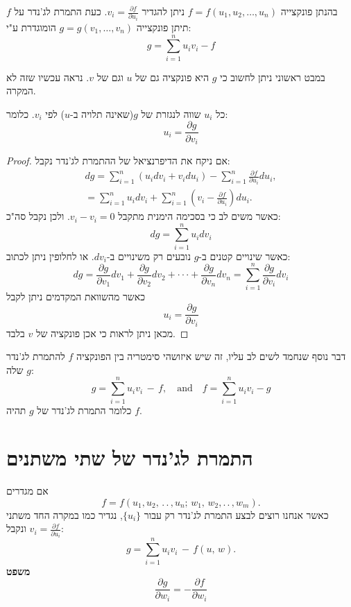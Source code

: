 \documentclass{tstextbook}
\begin{document}
\begin{definition}
בהנתן פונקצייה \(f=f\left( u_{1},u_{2},\dots,u_{n} \right)\) ניתן להגדיר \(v_{i}=\frac{\partial f}{\partial u_{i}}{}\). כעת התמרת לג'נדר על \(f\) תיתן פונקצייה \(g=g\left( v_{1},\dots,v_{n} \right)\) הומוגדרת ע"י:
$$g=\sum_{i=1}^{n}u_{i}v_{i}-f$$

\end{definition}
במבט ראשוני ניתן לחשוב כי \(g\) היא פונקציה גם של \(u\) וגם של \(v\). נראה עכשיו שזה לא המקרה.

\begin{theorem}
כל \(u_i\) שווה לנגזרת של \(g\)(שאינה תלויה ב-\(u\)) לפי \(v_{i}\). כלומר:
 $$u_{i}=\frac{\partial g}{\partial v_{i}}$$

\end{theorem}
\begin{proof}
אם ניקח את הדיפרנציאל של ההתמרת לג'נדר נקבל:
 $$\begin{array}{c}{{d g=\displaystyle\sum_{i=1}^{n}\left(u_{i}d v_{i}+v_{i}d u_{i}\right)-\sum_{i=1}^{n}\frac{\partial f}{\partial u_{i}}d u_{i},}}\\ {{=\displaystyle\sum_{i=1}^{n}u_{i}d v_{i}+\sum_{i=1}^{n}\left(v_{i}-\frac{\partial f}{\partial u_{i}}\right)d u_{i}.}}\end{array}$$
כאשר משים לב כי בסכימה הימנית מתקבל \(v_{i}-v_{i}=0\). ולכן נקבל סה"כ:
 $$d g=\sum_{i=1}^{n}u_{i}d v_{i}$$
כאשר שינויים קטנים ב-\(g\) נובעים רק משינויים ב-\(dv_{i}\). או לחלופין ניתן לכתוב:
 $$d g={\frac{\partial g}{\partial v_{1}}}d v_{1}+{\frac{\partial g}{\partial v_{2}}}d v_{2}+\cdot\cdot\cdot+{\frac{\partial g}{\partial v_{n}}}d v_{n}=\sum_{i=1}^{n}{\frac{\partial g}{\partial v_{i}}}d v_{i}$$
כאשר מהשוואת המקדמים ניתן לקבל
 $$u_{i}={\frac{\partial g}{\partial v_{i}}}$$
 מכאן ניתן לראות כי אכן פונקציה של \(v\) בלבד.

\end{proof}
\begin{remark}
דבר נוסף שנחמד לשים לב עליו, זה שיש איזושהי סימטריה בין הפונקציה \(f\) להתמרת לג'נדר שלה \(g\):
$$g=\sum_{i=1}^{n}u_{i}v_{i}\,-\,f,\quad{\mathrm{and}}\quad f=\sum_{i=1}^{n}u_{i}v_{i}-g$$
כלומר התמרת לג'נדר של \(g\) תהיה \(f\).

\end{remark}
\section{התמרת לג'נדר של שתי משתנים}

אם מגדרים $$f=f(u_{1},u_{2},\,.\,.\,,u_{n};\,w_{1},\,w_{2},.\,.\,,w_{m}).$$
כאשר אנחנו רוצים לבצע התמרת לג'נדר רק עבור \(\{ u_{i} \}\), נגדיר כמו במקרה החד משתני \(v_{i}=\frac{\partial f}{\partial u_{i}}\) ונקבל:
$$g=\sum_{i=1}^{n}u_{i}v_{i}\,-\,f(u,\,w).$$\textbf{משפט}$$\frac{\partial g}{\partial w_{i}}=-\frac{\partial f}{\partial w_{i}}$$
\end{document}
